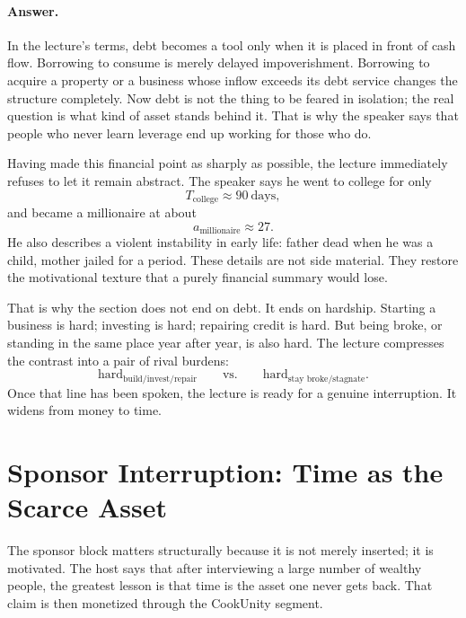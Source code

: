 \paragraph{Answer.} In the lecture's terms, debt becomes a tool only when it is placed in front of cash flow. Borrowing to consume is merely delayed impoverishment. Borrowing to acquire a property or a business whose inflow exceeds its debt service changes the structure completely. Now debt is not the thing to be feared in isolation; the real question is what kind of asset stands behind it. That is why the speaker says that people who never learn leverage end up working for those who do.

Having made this financial point as sharply as possible, the lecture immediately refuses to let it remain abstract. The speaker says he went to college for only
\begin{equation}
T_{\text{college}} \approx 90\ \text{days},
\end{equation}
and became a millionaire at about
\begin{equation}
a_{\text{millionaire}} \approx 27.
\end{equation}
He also describes a violent instability in early life: father dead when he was a child, mother jailed for a period. These details are not side material. They restore the motivational texture that a purely financial summary would lose.

That is why the section does not end on debt. It ends on hardship. Starting a business is hard; investing is hard; repairing credit is hard. But being broke, or standing in the same place year after year, is also hard. The lecture compresses the contrast into a pair of rival burdens:
\begin{equation}
\text{hard}_{\text{build/invest/repair}}
\qquad \text{vs.} \qquad
\text{hard}_{\text{stay broke/stagnate}}.
\end{equation}
Once that line has been spoken, the lecture is ready for a genuine interruption. It widens from money to time.

\section{Sponsor Interruption: Time as the Scarce Asset}

The sponsor block matters structurally because it is not merely inserted; it is motivated. The host says that after interviewing a large number of wealthy people, the greatest lesson is that time is the asset one never gets back. That claim is then monetized through the CookUnity segment.

